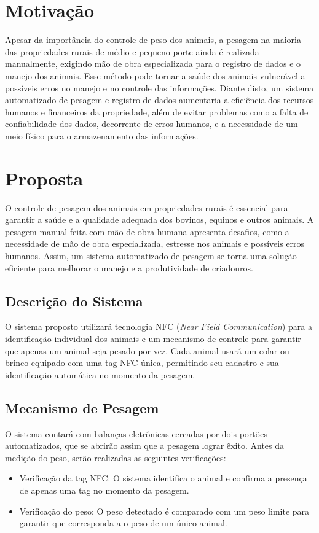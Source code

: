 \documentclass[11pt]{article}
\begin{document}
\section{Motivação}
Apesar da importância do controle de peso dos animais, a pesagem na maioria das propriedades rurais de médio e pequeno porte ainda é realizada manualmente, exigindo mão de obra especializada para o registro de dados e o manejo dos animais. Esse método pode tornar a saúde dos animais vulnerável a possíveis erros no manejo e no controle das informações. Diante disto, um sistema automatizado de pesagem e registro de dados aumentaria a eficiência dos recursos humanos e financeiros da propriedade, além de evitar problemas como a falta de confiabilidade dos dados, decorrente de erros humanos, e a necessidade de um meio físico para o armazenamento das informações.

\section{Proposta}
O controle de pesagem dos animais em propriedades rurais é essencial para garantir a saúde e a qualidade adequada dos bovinos, equinos e outros animais. A pesagem manual feita com mão de obra humana apresenta desafios, como a necessidade de mão de obra especializada, estresse nos animais e possíveis erros humanos. Assim, um sistema automatizado de pesagem se torna uma solução eficiente para melhorar o manejo e a produtividade de criadouros.

\subsection{Descrição do Sistema}
O sistema proposto utilizará tecnologia NFC (\textit{Near Field Communication}) para a identificação individual dos animais e um mecanismo de controle para garantir que apenas um animal seja pesado por vez. Cada animal usará um colar ou brinco equipado com uma tag NFC única, permitindo seu cadastro e sua identificação automática no momento da pesagem.

\subsection{Mecanismo de Pesagem}
O sistema contará com balanças eletrônicas cercadas por dois portões automatizados, que se abrirão assim que a pesagem lograr êxito. Antes da medição do peso, serão realizadas as seguintes verificações:

\begin{itemize}
    \item Verificação da tag NFC: O sistema identifica o animal e confirma a presença de apenas uma tag no momento da pesagem.
    \item Verificação do peso: O peso detectado é comparado com um peso limite para garantir que corresponda a o peso de um único animal.
\end{itemize}
\end{document}
